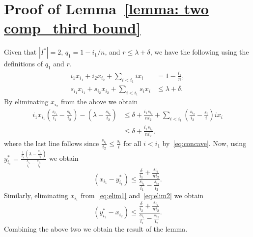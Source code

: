 \documentclass[a4paper]{article}
\theoremstyle{plain}
\theoremstyle{definition}
\theoremstyle{case}
\theoremstyle{remark}
\newcommand{\brac}[1]{\left(#1\right)}
\begin{document}
\section{Proof of Lemma~\ref{lemma: two comp_third bound}}

Given that $|I^*|=2$, $q_1=1-i_1/n$, and $r \leq \lambda +\delta$,  we have the following using the definitions of $q_1$ and $r$.
\begin{align}
    i_1 x_{i_1} + i_2 x_{i_2} +\sum_{i < i_1} ix_i&= 1 - \frac{i_1}{n},\label{eq:elim1}
    \\s_{i_1}x_{i_1} + s_{i_2}x_{i_2} +\sum_{i <i_1}s_ix_i& \leq \lambda + \delta.
    \label{eq:elim2}
\end{align}
%
By eliminating $x_{i_2}$ from the above we obtain
\begin{align}
    {i_1}x_{i_1} \brac{\frac{s_{i_1}}{i_1}-\frac{s_{i_2}}{i_2}} - (\lambda -\frac{s_{i_2}}{i_2}) &\leq \delta + \frac{i_1 s_{i_2}}{n i_2}+\sum_{i < i_1} \brac{\frac{s_{i_2}}{i_2}-\frac{s_{i}}{i}} ix_i\\
    &\leq \delta + \frac{i_1 s_{i_2}}{n i_2},
\end{align}
%
where the last line follows since $\frac{s_{i_2}}{i_2}\leq \frac{s_i}{i}$ for all $i <i_1$ by~\eqref{eq:concave}.
%
%
Now, using $y_{i_1}^* = \frac{\frac{1}{i_1} \brac{ \lambda- \frac{s_{i_2}}{i_2}}}{\frac{s_{i_1}}{i_1}-\frac{s_{i_2}}{i_2}}$ we obtain
\begin{equation}
(x_{i_1}-y_{i_1}^*)\leq \frac{\frac{\delta}{i_1} + \frac{s_{i_2}}{n i_2}}{\frac{s_{i_1}}{i_1}-\frac{s_{i_2}}{i_2}}.
\end{equation}
%
Similarly, eliminating $x_{i_1}$ from~\eqref{eq:elim1} and~\eqref{eq:elim2} we obtain
\begin{equation}
(y_{i_2}^*-x_{i_2})\leq \frac{\frac{\delta}{i_2} + \frac{s_{i_1}}{n i_2}}{\frac{s_{i_1}}{i_1}-\frac{s_{i_2}}{i_2}}.
\end{equation}
%
Combining the above two we obtain the result of the lemma.
\end{document}
